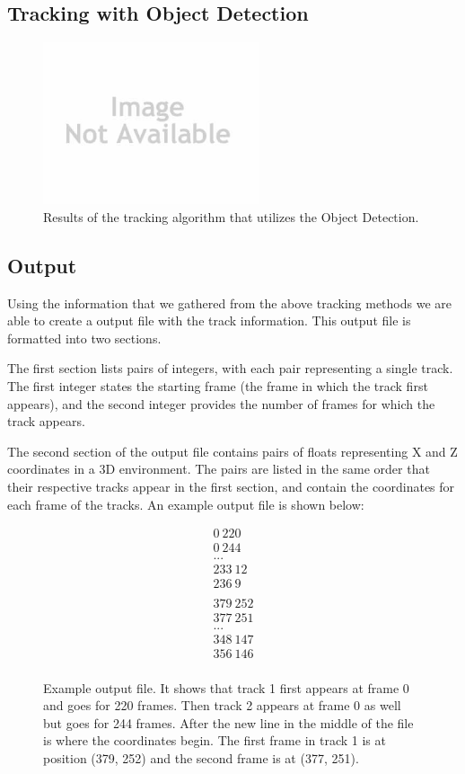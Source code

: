 \documentclass[conference]{IEEEtran}
\begin{document}
\subsection{Tracking with Object Detection}

\begin{figure}[!t]
\centering
\includegraphics[width=2.5in]{noImage.jpg}
\caption{Results of the tracking algorithm that utilizes the Object Detection.}
\label{Tracking_Object_Detection}
\end{figure}

\subsection{Output}

Using the information that we gathered from the above tracking methods we are able to create a output file with the track information. This output file is formatted into two sections.

The first section lists pairs of integers, with each pair representing a single track. The first integer states the starting frame (the frame in which the track first appears), and the second integer provides the number of frames for which the track appears. 

The second section of the output file contains pairs of floats representing X and Z coordinates in a 3D environment. The pairs are listed in the same order that their respective tracks appear in the first section, and contain the coordinates for each frame of the tracks. An example output file is shown below:

\begin{figure}
\begin{gather*}
0\ 220 \\
0\ 244 \\
...  \\
233\ 12 \\
236\ 9   \\
 \\
379\ 252 \\
377\ 251 \\
...  \\
348\ 147 \\
356\ 146 \\
\end{gather*}
\caption{Example output file. It shows that track 1 first appears at frame 0 and goes for 220 frames. Then track 2 appears at frame 0 as well but goes for 244 frames. After the new line in the middle of the file is where the coordinates begin. The first frame in track 1 is at position (379, 252) and the second frame is at (377, 251).}
\end{figure}
\end{document}
